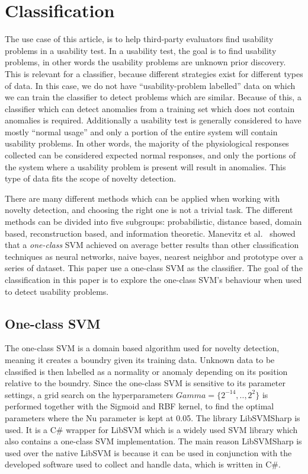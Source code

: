 \section{Classification}
The use case of this article, is to help third-party evaluators find usability problems in a usability test.
In a usability test, the goal is to find usability problems, in other words the usability problems are unknown prior discovery. This is relevant for a classifier, because different strategies exist for different types of data. In this case, we do not have ``usability-problem labelled'' data on which we can train the classifier to detect problems which are similar. Because of this, a classifier which can detect anomalies from a training set which does not contain anomalies is required.
Additionally a usability test is generally considered to have mostly ``normal usage'' and only a portion of the entire system will contain usability problems. In other words, the majority of the physiological responses collected can be considered expected normal responses, and only the portions of the system where a usability problem is present will result in anomalies.
This type of data fits the scope of novelty detection\cite{noveltyDetection}.

There are many different methods which can be applied when working with novelty detection\cite{noveltyDetection}, and choosing the right one is not a trivial task.
The different methods can be divided into five subgroups: probabilistic, distance based, domain based, reconstruction based, and information theoretic.
Manevitz et al.~\cite{oneClassSVM} showed that a \textit{one-class} SVM achieved on average better results than other classification techniques as neural networks, naive bayes, nearest neighbor and prototype over a series of dataset.
This paper use a one-class SVM as the classifier.
The goal of the classification in this paper is to explore the one-class SVM's behaviour when used to detect usability problems.

\subsection{One-class SVM}
The one-class SVM is a domain based algorithm used for novelty detection, meaning it creates a boundry given its training data.
Unknown data to be classified is then labelled as a normality or anomaly depending on its position relative to the boundry.
Since the one-class SVM is sensitive\cite{oneClassSVM} to its parameter settings, a grid search on the hyperparameters $Gamma = \{2^{-14},..,2^2\}$ is performed together with the Sigmoid and RBF kernel, to find the optimal parameters where the Nu parameter is kept at 0.05.
The library LibSVMSharp\cite{libsvmsharp} is used. It is a C\# wrapper for LibSVM\cite{libsvm} which is a widely used SVM library which also contains a one-class SVM implementation. The main reason LibSVMSharp is used over the native LibSVM is because it can be used in conjunction with the developed software used to collect and handle data, which is written in C\#.

